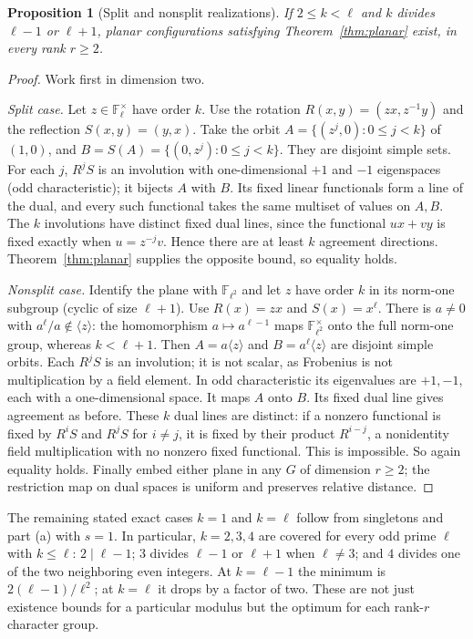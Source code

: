 \documentclass[11pt]{article}
\newtheorem{proposition}[theorem]{Proposition}
\theoremstyle{remark}\newtheorem{remark}[theorem]{Remark}
\newcommand{\F}{\mathbb F}
\begin{document}
\begin{proposition}[Split and nonsplit realizations]\label{prop:dihedral}
If $2\le k<\ell$ and $k$ divides $\ell-1$ or $\ell+1$, planar configurations satisfying Theorem~\ref{thm:planar} exist, in every rank $r\ge2$.
\end{proposition}
\begin{proof}
Work first in dimension two.

\emph{Split case.} Let $z\in\F_\ell^\times$ have order $k$. Use the rotation $R(x,y)=(zx,z^{-1}y)$ and the reflection $S(x,y)=(y,x)$. Take the orbit $A=\{(z^j,0):0\le j<k\}$ of $(1,0)$, and $B=S(A)=\{(0,z^j):0\le j<k\}$. They are disjoint simple sets. For each $j$, $R^jS$ is an involution with one-dimensional $+1$ and $-1$ eigenspaces (odd characteristic); it bijects $A$ with $B$. Its fixed linear functionals form a line of the dual, and every such functional takes the same multiset of values on $A,B$. The $k$ involutions have distinct fixed dual lines, since the functional $ux+vy$ is fixed exactly when $u=z^{-j}v$. Hence there are at least $k$ agreement directions. Theorem~\ref{thm:planar} supplies the opposite bound, so equality holds.

\emph{Nonsplit case.} Identify the plane with $\F_{\ell^2}$ and let $z$ have order $k$ in its norm-one subgroup (cyclic of size $\ell+1$). Use $R(x)=zx$ and $S(x)=x^\ell$. There is $a\ne0$ with $a^\ell/a\notin\langle z\rangle$: the homomorphism $a\mapsto a^{\ell-1}$ maps $\F_{\ell^2}^\times$ onto the full norm-one group, whereas $k<\ell+1$. Then $A=a\langle z\rangle$ and $B=a^\ell\langle z\rangle$ are disjoint simple orbits. Each $R^jS$ is an involution; it is not scalar, as Frobenius is not multiplication by a field element. In odd characteristic its eigenvalues are $+1,-1$, each with a one-dimensional space. It maps $A$ onto $B$. Its fixed dual line gives agreement as before. These $k$ dual lines are distinct: if a nonzero functional is fixed by $R^iS$ and $R^jS$ for $i\ne j$, it is fixed by their product $R^{i-j}$, a nonidentity field multiplication with no nonzero fixed functional. This is impossible. So again equality holds. Finally embed either plane in any $G$ of dimension $r\ge2$; the restriction map on dual spaces is uniform and preserves relative distance.
\end{proof}

The remaining stated exact cases $k=1$ and $k=\ell$ follow from singletons and part (a) with $s=1$. In particular, $k=2,3,4$ are covered for every odd prime $\ell$ with $k\le\ell$: $2\mid\ell-1$; $3$ divides $\ell-1$ or $\ell+1$ when $\ell\ne3$; and $4$ divides one of the two neighboring even integers. At $k=\ell-1$ the minimum is $2(\ell-1)/\ell^2$; at $k=\ell$ it drops by a factor of two. These are not just existence bounds for a particular modulus but the optimum for each rank-$r$ character group.
\end{document}
